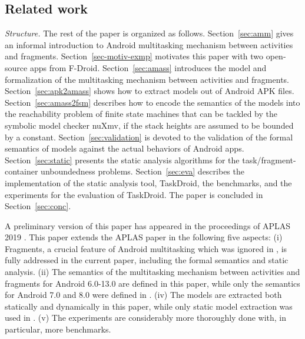 
\subsection{Related work}\label{sec:related}

\medskip
 
\noindent\emph{Structure.} The rest of the paper is organized as follows. 
Section~\ref{sec:amm} gives an informal introduction to Android multitasking mechanism between activities and fragments. 
Section~\ref{sec-motiv-exmp} motivates this paper with two open-source apps from F-Droid. 
Section~\ref{sec:amass} introduces the {\AMASS} model and formalization of the multitasking mechanism  between activities and fragments. Section~\ref{sec:apk2amass} shows how to extract {\AMASS} models out of Android APK files. Section~\ref{sec:amass2fsm} describes how to encode the semantics of the {\AMASS} models into the reachability problem of finite state machines  that can be tackled by the symbolic model checker nuXmv, if the stack heights are assumed to be bounded by a constant. Section~\ref{sec:validation} is devoted to the validation of the formal semantics of {\AMASS} models against the actual behaviors of Android apps. 
Section~\ref{sec:static} presents the static analysis algorithms for the task/fragment-container unboundedness problems. 
Section~\ref{sec:eva} describes the implementation of the static analysis tool, TaskDroid, the benchmarks, and the experiments for the evaluation of TaskDroid. %
The paper is concluded in Section~\ref{sec:conc}. 

\medskip

A preliminary version of this paper has appeared in the proceedings of APLAS 2019 \cite{HCWWY19}. This paper extends the APLAS paper in the following five aspects: (i) Fragments, a crucial feature of Android multitasking which was ignored in \cite{HCWWY19}, is fully addressed in the current paper, including the formal semantics and static analysis. (ii) The semantics of the multitasking mechanism between activities and fragments for Android 6.0-13.0 are defined in this paper, while only the semantics for Android 7.0 and 8.0 were defined in \cite{HCWWY19}.  (iv) The models are extracted both statically and dynamically in this paper, while only static model extraction was used in \cite{HCWWY19}. (v) The experiments are considerably more thoroughly done with, in particular, more benchmarks.
 
